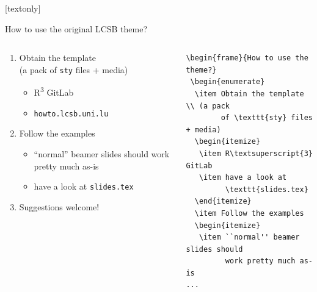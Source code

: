 \documentclass[aspectratio=169]{beamer}
\begin{document}
{%
[textonly]

\begin{frame}[fragile]{How to use the original LCSB theme?}
\begin{columns}
\begin{column}{0.6\linewidth}
\begin{enumerate}
\item Obtain the template \\ (a pack of \texttt{sty} files + media)
\begin{itemize}
\item R\textsuperscript{3} GitLab
\item \texttt{howto.lcsb.uni.lu}
\end{itemize}
\item Follow the examples
\begin{itemize}
\item ``normal'' beamer slides should work pretty much as-is
\item have a look at \texttt{slides.tex}
\end{itemize}
\item Suggestions welcome!
\end{enumerate}
\end{column}
\begin{column}{0.4\linewidth}
\tiny
\begin{verbatim}
\begin{frame}{How to use the theme?}
 \begin{enumerate}
  \item Obtain the template \\ (a pack
        of \texttt{sty} files + media)
  \begin{itemize}
   \item R\textsuperscript{3} GitLab
   \item have a look at
         \texttt{slides.tex}
  \end{itemize}
  \item Follow the examples
  \begin{itemize}
   \item ``normal'' beamer slides should
         work pretty much as-is
...
\end{verbatim}
\end{column}
\end{columns}
\end{frame}
}
\end{document}
